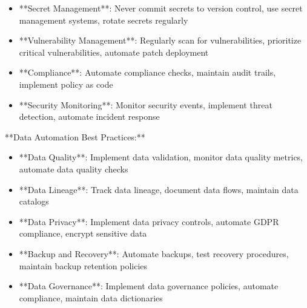 \documentclass[11pt,a4paper]{article}
\begin{document}
\begin{itemize}
\item **Secret Management**: Never commit secrets to version control, use secret management systems, rotate secrets regularly
\end{itemize}

\begin{itemize}
\item **Vulnerability Management**: Regularly scan for vulnerabilities, prioritize critical vulnerabilities, automate patch deployment
\end{itemize}

\begin{itemize}
\item **Compliance**: Automate compliance checks, maintain audit trails, implement policy as code
\end{itemize}

\begin{itemize}
\item **Security Monitoring**: Monitor security events, implement threat detection, automate incident response
\end{itemize}

**Data Automation Best Practices:**

\begin{itemize}
\item **Data Quality**: Implement data validation, monitor data quality metrics, automate data quality checks
\end{itemize}

\begin{itemize}
\item **Data Lineage**: Track data lineage, document data flows, maintain data catalogs
\end{itemize}

\begin{itemize}
\item **Data Privacy**: Implement data privacy controls, automate GDPR compliance, encrypt sensitive data
\end{itemize}

\begin{itemize}
\item **Backup and Recovery**: Automate backups, test recovery procedures, maintain backup retention policies
\end{itemize}

\begin{itemize}
\item **Data Governance**: Implement data governance policies, automate compliance, maintain data dictionaries
\end{itemize}
\end{document}
